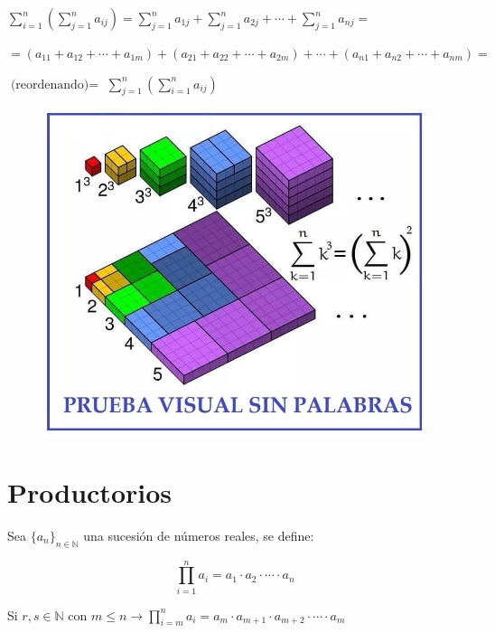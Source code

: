 $\displaystyle  \sum_{i=1}^n \left(\sum_{j=1}^n a_{ij} \right) = 
\sum_{j=1}^n a_{1j}+\sum_{j=1}^n a_{2j}+\cdots +\sum_{j=1}^n a_{nj}=$

\noindent \scriptsize{$=(a_{11}+a_{12}+\cdots +a_{1m})+(a_{21}+a_{22}+\cdots +a_{2m})+\cdots + (a_{n1}+a_{n2}+\cdots +a_{nm}) = $}

\normalsize{$\text{(reordenando)}=$}
$\displaystyle \sum_{j=1}^n \left(\sum_{i=1}^n a_{ij} \right)$

\begin{figure}[H]
	\centering
	\includegraphics[width=1\textwidth]{imagenes/apendices/APENDICESIM03.png}
\end{figure}


\section{Productorios}

\begin{defi}
Sea $\{a_n\}_{n\in \mathbb N}$	 una sucesión de números reales, se define:

\begin{equation*}
	\boxed{\; \prod_{i=1}^n a_i=a_1\cdot a_2 \cdot \cdots \cdot a_n \; }
\end{equation*}

Si $r,s \in \mathbb N \text{ con } m\le n \to \displaystyle
\prod_{i=m}^n a_i= a_m \cdot  a_{m+1} \cdot  a_{m+2} \cdot \cdots \cdot a_m $

\end{defi}

